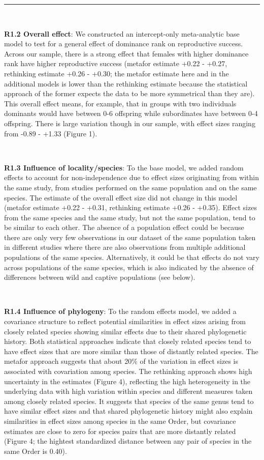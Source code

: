 \documentclass[
]{article}
\begin{document}
\begin{center}\rule{0.5\linewidth}{0.5pt}\end{center}

~

\textbf{R1.2 Overall effect}: We constructed an intercept-only
meta-analytic base model to test for a general effect of dominance rank
on reproductive success. Across our sample, there is a strong effect
that females with higher dominance rank have higher reproductive success
(metafor estimate +0.22 - +0.27, rethinking estimate +0.26 - +0.30; the
metafor estimate here and in the additional models is lower than the
rethinking estimate because the statistical approach of the former
expects the data to be more symmetrical than they are). This overall
effect means, for example, that in groups with two individuals dominants
would have between 0-6 offspring while subordinates have between 0-4
offspring. There is large variation though in our sample, with effect
sizes ranging from -0.89 - +1.33 (Figure 1).

~

\textbf{R1.3 Influence of locality/species}: To the base model, we added
random effects to account for non-independence due to effect sizes
originating from within the same study, from studies performed on the
same population and on the same species. The estimate of the overall
effect size did not change in this model (metafor estimate +0.22 -
+0.31, rethinking estimate +0.26 - +0.35). Effect sizes from the same
species and the same study, but not the same population, tend to be
similar to each other. The absence of a population effect could be
because there are only very few observations in our dataset of the same
population taken in different studies where there are also observations
from multiple additional populations of the same species. Alternatively,
it could be that effects do not vary across populations of the same
species, which is also indicated by the absence of differences between
wild and captive populations (see below).

~

\textbf{R1.4 Influence of phylogeny}: To the random effects model, we
added a covariance structure to reflect potential similarities in effect
sizes arising from closely related species showing similar effects due
to their shared phylogenetic history. Both statistical approaches
indicate that closely related species tend to have effect sizes that are
more similar than those of distantly related species. The metafor
approach suggests that about 20\% of the variation in effect sizes is
associated with covariation among species. The rethinking approach shows
high uncertainty in the estimates (Figure 4), reflecting the high
heterogeneity in the underlying data with high variation within species
and different measures taken among closely related species. It suggests
that species of the same genus tend to have similar effect sizes and
that shared phylogenetic history might also explain similarities in
effect sizes among species in the same Order, but covariance estimates
are close to zero for species pairs that are more distantly related
(Figure 4; the hightest standardized distance between any pair of
species in the same Order is 0.40).
\end{document}

